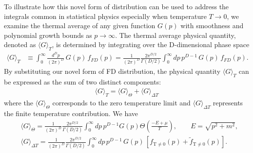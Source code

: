\documentclass[sn-mathphys,Numbered]{sn-jnl}
\newcommand{\req}[1]{Eq.\,(\ref{#1})}
\newcommand*{\xgreen}{\color{green}}
\begin{document}

To illustrate  how this novel form of distribution can be used to address the integrals common in statistical physics especially when temperature $T\to0$, we examine the thermal average of any given function $G(p)$ with smoothness and polynomial growth bounds  as $p\to \infty$. The thermal average physical quantity, denoted as $\langle G\rangle_T$, is determined by integrating over the D-dimensional phase space 
\begin{align}\label{eq:avg_G_T}
\langle G\rangle_T&\equiv\int^{\infty}_{0}\!\!\frac{d^Dp}{(2\pi)^D}\,G(p)\,f_{FD}(p)=\frac{1}{(2\pi)^D}\frac{2\pi^{D/2}}{\Gamma(D/2)}\int^{\infty}_{0}\!\!dp\,p^{D-1}\,G(p)\,f_{FD}(p).
\end{align}
By substituting our novel form of FD distribution, the physical quantity $\langle G\rangle_T$ can be expressed as the sum of two distinct components:
\begin{align}
\langle G\rangle_T=\langle G\rangle_{\Theta}+\langle G\rangle_{\Delta T}
\end{align}
 where the $\langle G\rangle_{\Theta}$ corresponds to the zero temperature limit and $\langle G\rangle_{\Delta T}$ represents the finite temperature contribution. We have
\begin{align}
&\langle G\rangle_{\Theta}=\frac{1}{(2\pi)^D}\frac{2\pi^{D/2}}{\Gamma(D/2)}\int^{\infty}_{0}\!\!dp\,p^{D-1}G(p)\Theta\left(\frac{-E+\mu}{T}\right),\qquad E=\sqrt{p^2+m^2},\\
&\langle G\rangle_{\Delta T}=\frac{1}{(2\pi)^D}\frac{2\pi^{D/2}}{\Gamma(D/2)}\int^{\infty}_{0}\!\!dp\,p^{D-1}\,G(p)\,\left[f_\mathrm{T\neq0}(p)+\widetilde f_\mathrm{T\neq0}(p)\right].\label{G_deltaT}
\end{align}
\end{document}
